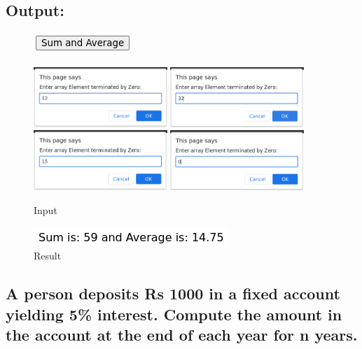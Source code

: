 \documentclass[12pt, a4paper]{article}
\begin{document}
\subsection*{Output:}
\setcounter{figure}{0}
\begin{figure}[h]
  \centering
  \includegraphics{30}
  \vskip40pt

  \includegraphics[width=0.45\textwidth]{31}
  \includegraphics[width=0.45\textwidth]{32}
  \includegraphics[width=0.45\textwidth]{33}
  \includegraphics[width=0.45\textwidth]{34}
  \caption{Input}
\end{figure}

\begin{figure}[h]
  \centering
  \includegraphics{35}
  \caption{Result}
\end{figure}

\pagebreak

\begin{tcolorbox}
  \section{A person deposits Rs 1000 in a fixed account yielding 5\% interest. Compute the amount in the account at the end of each year for n years.}
\end{tcolorbox}
\end{document}
